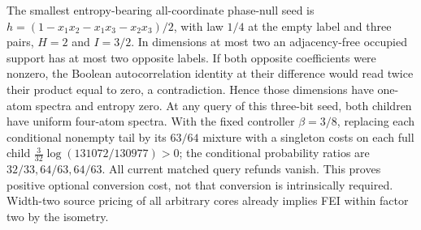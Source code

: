 The smallest entropy-bearing all-coordinate phase-null seed is
$h=(1-x_1x_2-x_1x_3-x_2x_3)/2$, with law $1/4$ at the empty label and
three pairs, $H=2$ and $I=3/2$. In dimensions at most two an
adjacency-free occupied support has at most two opposite labels. If both
opposite coefficients were nonzero, the Boolean autocorrelation identity
at their difference would read twice their product equal to zero, a
contradiction. Hence those dimensions have one-atom spectra and entropy
zero. At any query of this three-bit seed, both children have uniform
four-atom spectra. With the fixed controller $\beta=3/8$, replacing each
conditional nonempty tail by its $63/64$ mixture with a singleton costs
on each full child
$\frac3{32}\log(131072/130977)>0$; the conditional probability ratios
are $32/33,64/63,64/63$. All current matched query refunds vanish.
This proves positive optional conversion cost, not that conversion is
intrinsically required. Width-two source pricing of all arbitrary cores
already implies FEI within factor two by the isometry.


